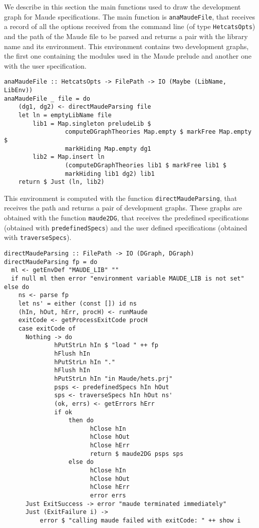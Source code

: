 
We describe in this section the main functions used to draw the
development graph for Maude specifications. The main function is
\verb"anaMaudeFile", that receives a record of all the options received
from the command line (of type \verb"HetcatsOpts") and the path of
the Maude file to be parsed and returns a pair with the library
name and its environment. This environment contains two development
graphs, the first one containing the modules used in the Maude prelude
and another one with the user specification.

{\codesize
\begin{verbatim}
anaMaudeFile :: HetcatsOpts -> FilePath -> IO (Maybe (LibName, LibEnv))
anaMaudeFile _ file = do
    (dg1, dg2) <- directMaudeParsing file
    let ln = emptyLibName file
        lib1 = Map.singleton preludeLib $
                 computeDGraphTheories Map.empty $ markFree Map.empty $
                 markHiding Map.empty dg1
        lib2 = Map.insert ln
                 (computeDGraphTheories lib1 $ markFree lib1 $
                 markHiding lib1 dg2) lib1
    return $ Just (ln, lib2)
\end{verbatim}
}

This environment is computed with the function
\verb"directMaudeParsing", that receives the path and returns
a pair of development graphs.
These graphs are obtained with the function \verb"maude2DG", that receives
the predefined specifications (obtained with \verb"predefinedSpecs")
and the user defined specifications (obtained with \verb"traverseSpecs").

{\codesize
\begin{verbatim}
directMaudeParsing :: FilePath -> IO (DGraph, DGraph)
directMaudeParsing fp = do
  ml <- getEnvDef "MAUDE_LIB" ""
  if null ml then error "environment variable MAUDE_LIB is not set" else do
    ns <- parse fp
    let ns' = either (const []) id ns
    (hIn, hOut, hErr, procH) <- runMaude
    exitCode <- getProcessExitCode procH
    case exitCode of
      Nothing -> do
              hPutStrLn hIn $ "load " ++ fp
              hFlush hIn
              hPutStrLn hIn "."
              hFlush hIn
              hPutStrLn hIn "in Maude/hets.prj"
              psps <- predefinedSpecs hIn hOut
              sps <- traverseSpecs hIn hOut ns'
              (ok, errs) <- getErrors hErr
              if ok
                  then do
                        hClose hIn
                        hClose hOut
                        hClose hErr
                        return $ maude2DG psps sps
                  else do
                        hClose hIn
                        hClose hOut
                        hClose hErr
                        error errs
      Just ExitSuccess -> error "maude terminated immediately"
      Just (ExitFailure i) ->
          error $ "calling maude failed with exitCode: " ++ show i
\end{verbatim}
}

